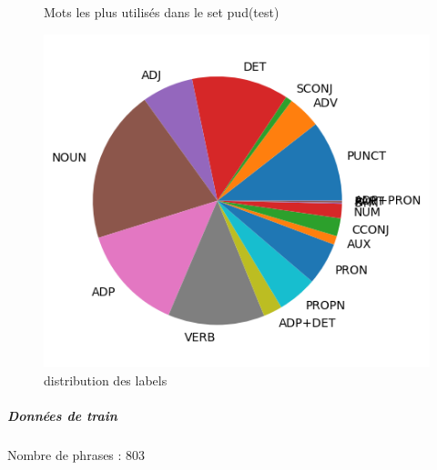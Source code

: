 \begin{figure}[H]
\begin{minipage}{0.48\textwidth}
\begin{tabular}{|l || *{11 }{|c} |}
\end{tabular}
\caption{ Mots les plus utilisés dans le set pud(test) } \label{Fig:muw}\end{minipage} 
\begin{minipage}{0.48\textwidth} \centering
\includegraphics[width=.7\linewidth]{pudtest_img.png}
\caption{distribution des labels}
\end{minipage}
\end{figure} \subparagraph{Données de train \\ }  
 Nombre de phrases : 803\\ 
